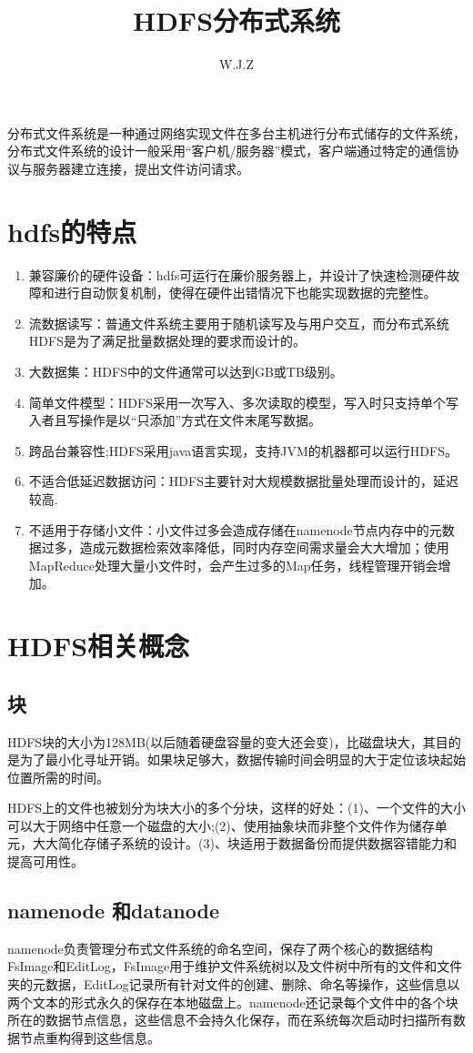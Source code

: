 \documentclass{article}
\title{HDFS分布式系统}
\author{W.J.Z}
\date{}
\begin{document}
	\maketitle
	分布式文件系统是一种通过网络实现文件在多台主机进行分布式储存的文件系统，分布式文件系统的设计一般采用“客户机/服务器”模式，客户端通过特定的通信协议与服务器建立连接，提出文件访问请求。
	\section{hdfs的特点}
	\begin{enumerate}
		\item 兼容廉价的硬件设备：hdfs可运行在廉价服务器上，并设计了快速检测硬件故障和进行自动恢复机制，使得在硬件出错情况下也能实现数据的完整性。
		\item 流数据读写：普通文件系统主要用于随机读写及与用户交互，而分布式系统HDFS是为了满足批量数据处理的要求而设计的。
		\item 大数据集：HDFS中的文件通常可以达到GB或TB级别。
		\item  简单文件模型：HDFS采用一次写入、多次读取的模型，写入时只支持单个写入者且写操作是以“只添加”方式在文件末尾写数据。
		\item 跨品台兼容性;HDFS采用java语言实现，支持JVM的机器都可以运行HDFS。	
		\item 不适合低延迟数据访问：HDFS主要针对大规模数据批量处理而设计的，延迟较高.		
		\item 不适用于存储小文件：小文件过多会造成存储在namenode节点内存中的元数据过多，造成元数据检索效率降低，同时内存空间需求量会大大增加；使用MapReduce处理大量小文件时，会产生过多的Map任务，线程管理开销会增加。
	\end{enumerate}
	\section{HDFS相关概念}
	\subsection{块}
	HDFS块的大小为128MB(以后随着硬盘容量的变大还会变)，比磁盘块大，其目的是为了最小化寻址开销。如果块足够大，数据传输时间会明显的大于定位该块起始位置所需的时间。
	
	HDFS上的文件也被划分为块大小的多个分块，这样的好处：(1)、一个文件的大小可以大于网络中任意一个磁盘的大小;(2)、使用抽象块而非整个文件作为储存单元，大大简化存储子系统的设计。(3)、块适用于数据备份而提供数据容错能力和提高可用性。
	\subsection{namenode 和datanode}
	namenode负责管理分布式文件系统的命名空间，保存了两个核心的数据结构FsImage和EditLog，FsImage用于维护文件系统树以及文件树中所有的文件和文件夹的元数据，EditLog记录所有针对文件的创建、删除、命名等操作，这些信息以两个文本的形式永久的保存在本地磁盘上。namenode还记录每个文件中的各个块所在的数据节点信息，这些信息不会持久化保存，而在系统每次启动时扫描所有数据节点重构得到这些信息。 
\end{document}
